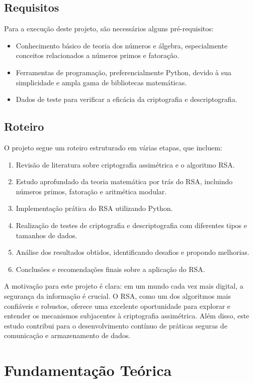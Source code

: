 \documentclass[a4paper,12pt]{article}
\begin{document}
\subsection*{Requisitos}
Para a execução deste projeto, são necessários alguns pré-requisitos:
\begin{itemize}
    \item Conhecimento básico de teoria dos números e álgebra, especialmente conceitos relacionados a números primos e fatoração.
    \item Ferramentas de programação, preferencialmente Python, devido à sua simplicidade e ampla gama de bibliotecas matemáticas.
    \item Dados de teste para verificar a eficácia da criptografia e descriptografia.
\end{itemize}

\subsection*{Roteiro}
O projeto segue um roteiro estruturado em várias etapas, que incluem:
\begin{enumerate}
    \item Revisão de literatura sobre criptografia assimétrica e o algoritmo RSA.
    \item Estudo aprofundado da teoria matemática por trás do RSA, incluindo números primos, fatoração e aritmética modular.
    \item Implementação prática do RSA utilizando Python.
    \item Realização de testes de criptografia e descriptografia com diferentes tipos e tamanhos de dados.
    \item Análise dos resultados obtidos, identificando desafios e propondo melhorias.
    \item Conclusões e recomendações finais sobre a aplicação do RSA.
\end{enumerate}

A motivação para este projeto é clara: em um mundo cada vez mais digital, a segurança da informação é crucial. O RSA, como um dos algoritmos mais confiáveis e robustos, oferece uma excelente oportunidade para explorar e entender os mecanismos subjacentes à criptografia assimétrica. Além disso, este estudo contribui para o desenvolvimento contínuo de práticas seguras de comunicação e armazenamento de dados.

\section*{Fundamentação Teórica}
\end{document}
